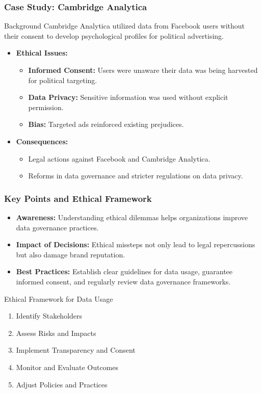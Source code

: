 \documentclass[aspectratio=169]{beamer}
\begin{document}
\begin{frame}[fragile]
    \frametitle{Case Study: Cambridge Analytica}
    \begin{block}{Background}
        Cambridge Analytica utilized data from Facebook users without their consent to develop psychological profiles for political advertising.
    \end{block}
    \begin{itemize}
        \item \textbf{Ethical Issues:}
            \begin{itemize}
                \item \textbf{Informed Consent:} Users were unaware their data was being harvested for political targeting.
                \item \textbf{Data Privacy:} Sensitive information was used without explicit permission.
                \item \textbf{Bias:} Targeted ads reinforced existing prejudices.
            \end{itemize}
        \item \textbf{Consequences:} 
            \begin{itemize}
                \item Legal actions against Facebook and Cambridge Analytica.
                \item Reforms in data governance and stricter regulations on data privacy.
            \end{itemize}
    \end{itemize}
\end{frame}

\begin{frame}[fragile]
    \frametitle{Key Points and Ethical Framework}
    \begin{itemize}
        \item \textbf{Awareness:} Understanding ethical dilemmas helps organizations improve data governance practices.
        \item \textbf{Impact of Decisions:} Ethical missteps not only lead to legal repercussions but also damage brand reputation.
        \item \textbf{Best Practices:} Establish clear guidelines for data usage, guarantee informed consent, and regularly review data governance frameworks.
    \end{itemize}
    
    \begin{block}{Ethical Framework for Data Usage}
        \begin{enumerate}
            \item Identify Stakeholders
            \item Assess Risks and Impacts
            \item Implement Transparency and Consent
            \item Monitor and Evaluate Outcomes
            \item Adjust Policies and Practices
        \end{enumerate}
    \end{block}
\end{frame}
\end{document}
